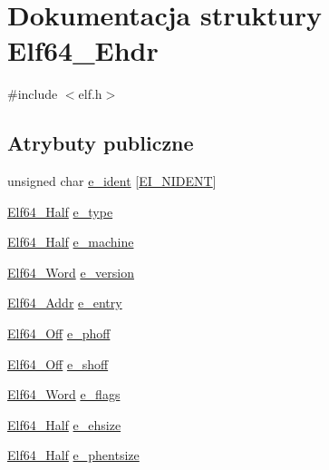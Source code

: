 \hypertarget{struct_elf64___ehdr}{\section{Dokumentacja struktury Elf64\-\_\-\-Ehdr}
\label{struct_elf64___ehdr}
}


{\ttfamily \#include $<$elf.\-h$>$}

\subsection*{Atrybuty publiczne}
\begin{DoxyCompactItemize}
\item 
unsigned char \hyperlink{struct_elf64___ehdr_acdd2e122af003c5b5708d1ae75b4a85c}{e\-\_\-ident} \mbox{[}\hyperlink{elf_8h_ae407130db14180c6737390604ba7c1fe}{E\-I\-\_\-\-N\-I\-D\-E\-N\-T}\mbox{]}
\item 
\hyperlink{elf_8h_adb6a5584018b431da3472e7c6a7fd731}{Elf64\-\_\-\-Half} \hyperlink{struct_elf64___ehdr_a031210e6571dad798c4ed66b85631d58}{e\-\_\-type}
\item 
\hyperlink{elf_8h_adb6a5584018b431da3472e7c6a7fd731}{Elf64\-\_\-\-Half} \hyperlink{struct_elf64___ehdr_adecc8b3641e23794f39c78f15ab8c809}{e\-\_\-machine}
\item 
\hyperlink{elf_8h_aa3aa1920ed115b7ef7e99716fece4401}{Elf64\-\_\-\-Word} \hyperlink{struct_elf64___ehdr_a3855471cf08a9e4cd4b898e9a1e11fa4}{e\-\_\-version}
\item 
\hyperlink{elf_8h_aeed51d08e3a950d637f8ec1f0cd4ef65}{Elf64\-\_\-\-Addr} \hyperlink{struct_elf64___ehdr_a943c7d038a3cc3c1115e84b4cd19966d}{e\-\_\-entry}
\item 
\hyperlink{elf_8h_a6f7837bc80df7a68291fce54ff088849}{Elf64\-\_\-\-Off} \hyperlink{struct_elf64___ehdr_adc7d13d5c0e0eb4b62f0f898f03b2e66}{e\-\_\-phoff}
\item 
\hyperlink{elf_8h_a6f7837bc80df7a68291fce54ff088849}{Elf64\-\_\-\-Off} \hyperlink{struct_elf64___ehdr_a63fca3f9b273e5fd4d190d9cb7fba9b0}{e\-\_\-shoff}
\item 
\hyperlink{elf_8h_aa3aa1920ed115b7ef7e99716fece4401}{Elf64\-\_\-\-Word} \hyperlink{struct_elf64___ehdr_ae6ea9e821472d35e7d2c446fa79bdc3a}{e\-\_\-flags}
\item 
\hyperlink{elf_8h_adb6a5584018b431da3472e7c6a7fd731}{Elf64\-\_\-\-Half} \hyperlink{struct_elf64___ehdr_a404b7e3566d912b0382cacea17475e92}{e\-\_\-ehsize}
\item 
\hyperlink{elf_8h_adb6a5584018b431da3472e7c6a7fd731}{Elf64\-\_\-\-Half} \hyperlink{struct_elf64___ehdr_ab5aefb7a14b9cf2eafcbaf0664852369}{e\-\_\-phentsize}

\end{DoxyCompactItemize}
